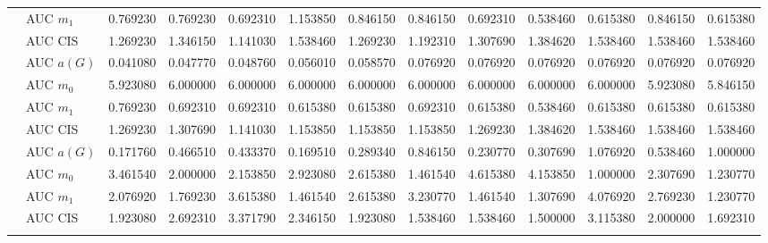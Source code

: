 \begin{table}[htbp]
\begin{tabular}{llrrrrrrrrrrr}
    & AUC $m_1$ & 0.769230 & 0.769230 & 0.692310 & 1.153850 & 0.846150 & 0.846150 & 0.692310 & 0.538460 & 0.615380 & 0.846150 & 0.615380 \\
    & AUC CIS & 1.269230 & 1.346150 & 1.141030 & 1.538460 & 1.269230 & 1.192310 & 1.307690 & 1.384620 & 1.538460 & 1.538460 & 1.538460 \\
    \addlinespace
    \multirow{4}{*}{degree} & AUC $a(G)$ & 0.041080 & 0.047770 & 0.048760 & 0.056010 & 0.058570 & 0.076920 & 0.076920 & 0.076920 & 0.076920 & 0.076920 & 0.076920 \\
    & AUC $m_0$ & 5.923080 & 6.000000 & 6.000000 & 6.000000 & 6.000000 & 6.000000 & 6.000000 & 6.000000 & 6.000000 & 5.923080 & 5.846150 \\
    & AUC $m_1$ & 0.769230 & 0.692310 & 0.692310 & 0.615380 & 0.615380 & 0.692310 & 0.615380 & 0.538460 & 0.615380 & 0.615380 & 0.615380 \\
    & AUC CIS & 1.269230 & 1.307690 & 1.141030 & 1.153850 & 1.153850 & 1.153850 & 1.269230 & 1.384620 & 1.538460 & 1.538460 & 1.538460 \\
    \addlinespace
    \multirow{4}{*}{random} & AUC $a(G)$ & 0.171760 & 0.466510 & 0.433370 & 0.169510 & 0.289340 & 0.846150 & 0.230770 & 0.307690 & 1.076920 & 0.538460 & 1.000000 \\
    & AUC $m_0$ & 3.461540 & 2.000000 & 2.153850 & 2.923080 & 2.615380 & 1.461540 & 4.615380 & 4.153850 & 1.000000 & 2.307690 & 1.230770 \\
    & AUC $m_1$ & 2.076920 & 1.769230 & 3.615380 & 1.461540 & 2.615380 & 3.230770 & 1.461540 & 1.307690 & 4.076920 & 2.769230 & 1.230770 \\
    & AUC CIS & 1.923080 & 2.692310 & 3.371790 & 2.346150 & 1.923080 & 1.538460 & 1.538460 & 1.500000 & 3.115380 & 2.000000 & 1.692310 \\
    \addlinespace
    \bottomrule
  \end{tabular}
\end{table}

